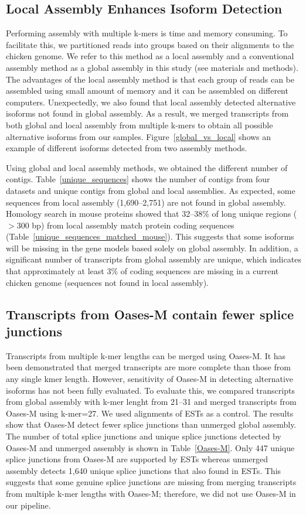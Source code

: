 \documentclass[10pt]{article}
\begin{document}
\subsection*{Local Assembly Enhances Isoform Detection}

Performing assembly with multiple k-mers is time and memory consuming.
To facilitate this, we partitioned reads into groups based on their alignments to the chicken genome.
We refer to this method as a local assembly and a conventional assembly method as a global assembly in this study (see materials and methods).
The advantages of the local assembly method is that each group of reads can be assembled using small amount of memory and it can be assembled on different computers.
Unexpectedly, we also found that local assembly detected alternative isoforms not found in global assembly.
As a result, we merged transcripts from both global and local assembly from multiple k-mers to obtain all possible alternative isoforms from our samples.
Figure~\ref{global_vs_local} shows an example of different isoforms detected from two assembly methods.

Using global and local assembly methods, we obtained the different number of contigs.
Table~\ref{unique_sequences} shows the number of contigs from four datasets and unique contigs from global and local assemblies.
As expected, some sequences from local assembly (1,690--2,751) are not found in global assembly.
Homology search in mouse proteins showed that 32--38\% of long unique regions ($>300$ bp) from local assembly match protein
coding sequences (Table~\ref{unique_sequences_matched_mouse}).
This suggests that some isoforms will be missing in the gene models based solely on global assembly.
In addition, a significant number of transcripts from global assembly are unique, which indicates that
approximately at least 3\% of coding sequences are missing in a current chicken genome (sequences not found in local assembly).

\subsection*{Transcripts from Oases-M contain fewer splice junctions}
Transcripts from multiple k-mer lengths can be merged using Oases-M.
It has been demonstrated that merged transcripts are more complete than those from any single kmer length\cite{Schulz:2012je}.
However, sensitivity of Oases-M in detecting alternative isoforms has not been fully evaluated.
To evaluate this, we compared transcripts from global assembly with k-mer lenght from 21--31 and merged transcripts from Oases-M using k-mer=27. We used alignments of ESTs as a control.
The results show that Oases-M detect fewer splice junctions than unmerged global assembly.
The number of total splice junctions and unique splice junctions detected by Oases-M and unmerged assembly is
shown in Table~\ref{Oases-M}.
Only 447 unique splice junctions from Oases-M are supported by ESTs whereas unmerged assembly detects 1,640
unique splice junctions that also found in ESTs.
This suggests that some genuine splice junctions are missing from merging transcripts from multiple k-mer
lengths with Oases-M; therefore, we did not use Oases-M in our pipeline.
\end{document}
